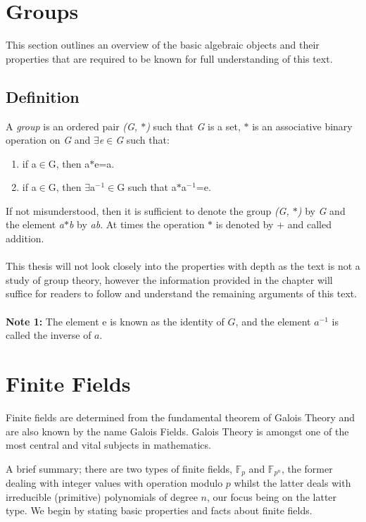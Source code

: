 \documentclass[iwp,first]{luthesis}
\begin{document}
\section{Groups}

This section outlines an overview of the basic algebraic objects and their properties that are required to be known for full understanding of this text.

\subsection{Definition} 
A \textit{group} is an ordered pair \textit{(G, $\ast$)} such that \textit{G} is a set, $\ast$ is an associative binary operation on \textit{G} and \textit{$\exists$e$\in$G} such that:

\begin{enumerate} 

\item if a$\in$G, then a$\ast$e=a.

\item if a$\in$G, then $\exists$a$^-$$^1$$\in$G such that a$\ast$a$^-$$^1$=e.

\end{enumerate}

If not misunderstood, then it is sufficient to denote the group \textit{(G, $\ast$)} by \textit{G} and the element \textit{a$\ast$b} by \textit{ab}. At times the operation $\ast$ is denoted by + and called addition.\cite{GRT}
\\
\\
This thesis will not look closely into the properties with depth as the text is not a study of group theory, however the information provided in the chapter will suffice for readers to follow and understand the remaining arguments of this text.
\\
\\
\textbf{Note 1:} The element e is known as the identity of $G$, and the element $a^{-1}$ is called the inverse of $a$.

\section{Finite Fields}

Finite fields are determined from the fundamental theorem of Galois Theory and are also known by the name Galois Fields. Galois Theory is amongst one of the most central and vital subjects in mathematics. 

A brief summary; there are two types of finite fields, $\mathbb{F}_{p}$ and $\mathbb{F}_{p^n}$, the former dealing with integer values with operation modulo $p$ whilst the latter deals with irreducible (primitive) polynomials of degree $n$, our focus being on the latter type. We begin by stating basic properties and facts about finite fields.
\end{document}

